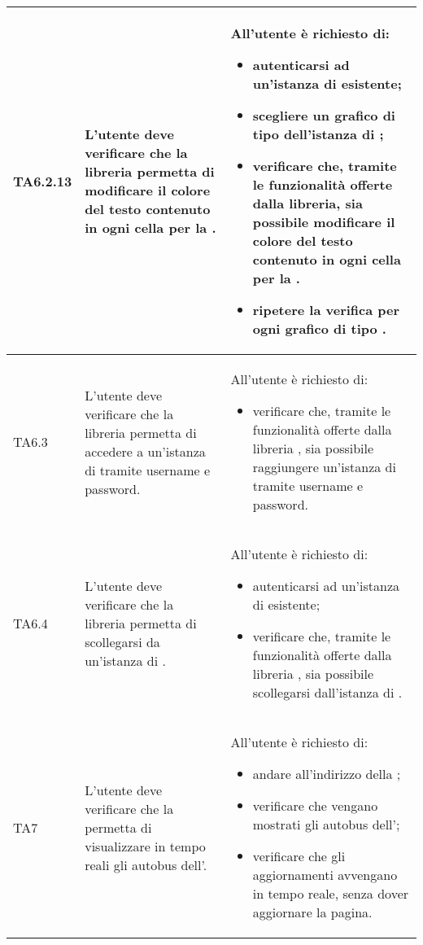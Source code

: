 \begin{longtabu}{| X[0.5] | X | X |}
	TA6.2.13 & L'utente  deve verificare che la libreria permetta di modificare il colore del testo contenuto in ogni cella per la .
		
		& All'utente  è richiesto di:
		\begin{itemize}
			\item autenticarsi ad un'istanza di \projectname{} esistente;
			\item scegliere un grafico di tipo  dell'istanza di \projectname{};
			\item verificare che, tramite le funzionalità offerte dalla libreria, sia possibile modificare il colore del testo contenuto in ogni cella per la .
			\item ripetere la verifica per ogni grafico di tipo .
		\end{itemize}
\\ \hline

	TA6.3 & L'utente  deve verificare che la libreria  permetta di accedere a un'istanza di \projectname{} tramite username e password.
		
		& All'utente  è richiesto di:
		\begin{itemize}
			\item verificare che, tramite le funzionalità offerte dalla libreria , sia possibile raggiungere un'istanza di \projectname{} tramite username e password.
		\end{itemize}
\\ \hline

	TA6.4 & L'utente  deve verificare che la libreria  permetta di scollegarsi da un'istanza di \projectname{}.

		& All'utente  è richiesto di:
		\begin{itemize}
			\item autenticarsi ad un'istanza di \projectname{} esistente;
			\item verificare che, tramite le funzionalità offerte dalla libreria , sia possibile scollegarsi dall'istanza di \projectname{}.
		\end{itemize}
\\ \hline

	TA7 & L'utente deve verificare che la  permetta di visualizzare in tempo reali gli autobus dell'.

		& All'utente è richiesto di:
		\begin{itemize}
			\item andare all'indirizzo della ;
			\item verificare che vengano mostrati gli autobus dell';
			\item verificare che gli aggiornamenti avvengano in tempo reale, senza dover aggiornare la pagina.
		\end{itemize}
\\ \hline


\end{longtabu}
